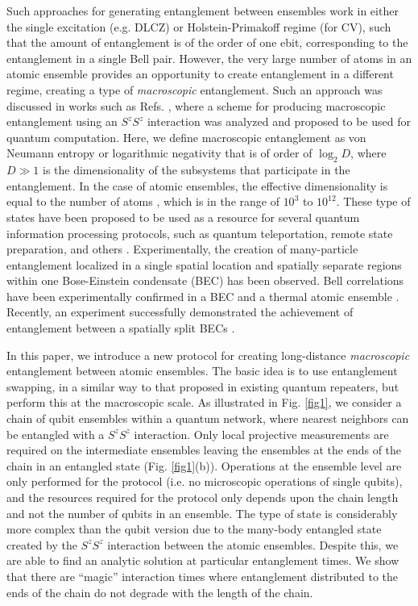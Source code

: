 \documentclass[12pt]{iopart}
\begin{document}
Such approaches for generating entanglement between ensembles work in either the single excitation  (e.g.  DLCZ) or Holstein-Primakoff regime (for CV), such that the amount of entanglement is of the order of one ebit, corresponding to the entanglement in a single Bell pair.  However, the very large number of atoms in an atomic ensemble provides an opportunity to create entanglement in a different regime, creating a type of {\it macroscopic} entanglement.  Such an approach was discussed in works such as Refs. \cite{byrnes2013fractality,pyrkov2013entanglement,rosseau2014,byrnes2012macroscopic,hussain2014geometric}, where a scheme for producing macroscopic entanglement using an $ S^z S^z$ interaction was analyzed and proposed to be used for quantum computation. Here, we define macroscopic entanglement as von Neumann entropy or logarithmic negativity that is of order of $ \log_2 D $, where $ D \gg 1  $ is the dimensionality of the subsystems that participate in the entanglement.  In the case of atomic ensembles, the effective dimensionality is equal to the number of atoms \cite{byrnes2020quantum}, which is in the range of $ 10^3 $ to $ 10^{12} $.   These type of states have been proposed to be used as a resource for several quantum information processing protocols, such as quantum teleportation, remote state preparation, and others \cite{pyrkov2014full,byrnes2015macroscopic,manish2021,byrnes2011accelerated}. Experimentally, 
the creation of many-particle entanglement localized in a single spatial location \cite{schmied2016bell} and spatially separate regions \cite{fadel2018spatial} within one Bose-Einstein condensate (BEC) has been observed. 
Bell correlations have been experimentally confirmed in a BEC \cite{schmied2016bell} and a thermal atomic ensemble \cite{engelsen2017}. Recently, an experiment successfully demonstrated the achievement of entanglement between a spatially split BECs \cite{Colciaghi2023}. 

In this paper, we introduce a new protocol for creating long-distance {\it macroscopic} entanglement between atomic ensembles. The basic idea is to use entanglement swapping, in a similar way to that proposed in existing quantum repeaters, but perform this at the macroscopic scale. As illustrated in Fig. \ref{fig1}, we consider a chain of qubit ensembles within a quantum network, where nearest neighbors can be entangled with a $S^z S^z$ interaction.  Only local projective measurements are required on the intermediate ensembles leaving the ensembles at the ends of the chain in an entangled state (Fig. \ref{fig1}(b)).  Operations at the ensemble level are only performed for the protocol (i.e. no microscopic operations of single qubits), and the resources required for the protocol only depends upon the chain length and not the number of qubits in an ensemble. 
The type of state is considerably more complex than the qubit version due to the many-body entangled state created by the $S^z S^z$ interaction between the atomic ensembles. Despite this, we are able to find an analytic solution at particular entanglement times.  We show that there are ``magic'' interaction times  where entanglement distributed to the ends of the chain do not degrade with the length of the chain. 
\end{document}
